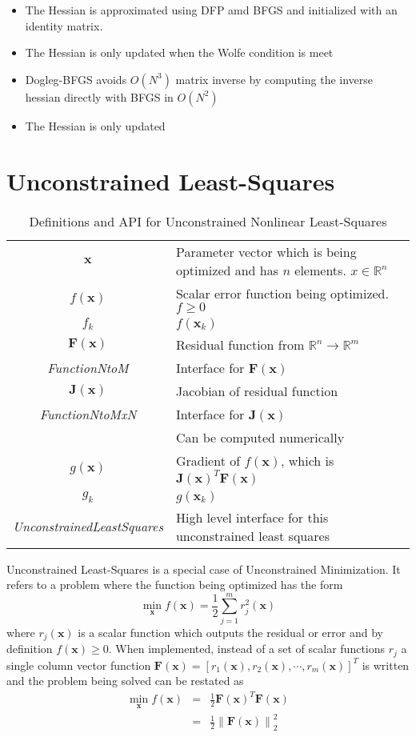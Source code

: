 \documentclass[peerreview,onecolumn]{IEEEtran}
\newcommand{\R}{\mathbb{R}}
\newcommand{\norm}[1]{\left\lVert#1\right\rVert}
\begin{document}
\begin{itemize}
	\item The Hessian is approximated using DFP amd BFGS and initialized with an identity matrix. 
	\item The Hessian is only updated when the Wolfe condition is meet
	\item Dogleg-BFGS avoids $O(N^3)$ matrix inverse by computing the inverse hessian directly with BFGS in $O(N^2)$
	\item The Hessian is only updated
\end{itemize}

\section{Unconstrained Least-Squares}
\begin{table*}[h]
\centering
\begin{tabular}{cl}
$\bm{x}$ & Parameter vector which is being optimized and has $n$ elements. $x \in \R^n$ \\
$f(\bm{x})$ & Scalar error function being optimized. $f \ge 0$ \\
$f_k$ & $f(\bm{x}_k)$ \\
$\bm{F}(\bm{x})$ &  Residual function from $\mathbb{R}^n \rightarrow \R^m$ \\
\textit{FunctionNtoM} & Interface for $\bm{F}(\bm{x})$ \\
$\bm{J}(\bm{x})$ & Jacobian of residual function \\
\textit{FunctionNtoMxN} & Interface for $\bm{J}(\bm{x})$ \\
 & Can be computed numerically \\
$g(\bm{x})$ & Gradient of $f(\bm{x})$, which is $\bm{J}(\bm{x})^T  \bm{F}(\bm{x})$ \\
$g_k$ & $g(\bm{x}_k)$ \\
\textit{UnconstrainedLeastSquares} & High level interface for this unconstrained least squares
\end{tabular}
\caption{\label{definitions:UNLS}Definitions and API for Unconstrained Nonlinear Least-Squares}
\end{table*}

Unconstrained Least-Squares is a special case of Unconstrained Minimization. It refers to a problem where the function being optimized has the form
\begin{equation}
\min\limits_{\bm{x}} f(\bm{x})=\frac{1}{2}\sum^m_{j=1} r^2_j(\bm{x})
\end{equation}
where $r_j(\bm{x})$ is a scalar function which outputs the residual or error and by definition $f(\bm{x}) \ge 0$. When implemented, instead of a set of scalar functions $r_j$ a single column vector function $\bm{F}(\bm{x}) = [ r_1(\bm{x}) , r_2(\bm{x}) , \cdots , r_m(\bm{x}) ]^T$ is written and the problem being solved can be restated as
\begin{eqnarray}
\min\limits_{\bm{x}} f(\bm{x})&=&\frac{1}{2} \bm{F}(\bm{x})^T \bm{F}(\bm{x})\\
&=& \frac{1}{2} \norm{\bm{F}(\bm{x})}^2_2
\end{eqnarray}
\end{document}
